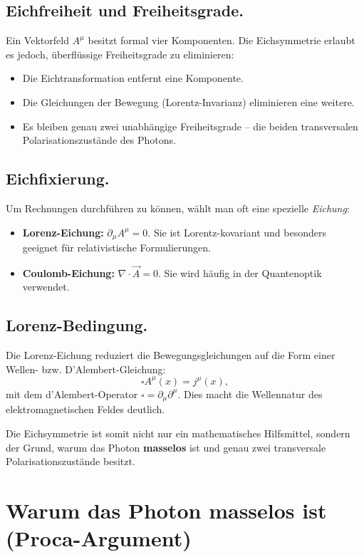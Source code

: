 \subsection*{Eichfreiheit und Freiheitsgrade.}
Ein Vektorfeld \( A^\mu \) besitzt formal vier Komponenten.  
Die Eichsymmetrie erlaubt es jedoch, überflüssige Freiheitsgrade zu eliminieren:
\begin{itemize}
	\item Die Eichtransformation entfernt eine Komponente.
	\item Die Gleichungen der Bewegung (Lorentz-Invarianz) 
	eliminieren eine weitere.
	\item Es bleiben genau zwei unabhängige Freiheitsgrade – 
	die beiden transversalen Polarisationszustände des Photons.
\end{itemize}

\subsection*{Eichfixierung.}
Um Rechnungen durchführen zu können, wählt man oft eine spezielle \emph{Eichung}:
\begin{itemize}
	\item \textbf{Lorenz-Eichung:} 
	\(\partial_\mu A^\mu = 0\).  
	Sie ist Lorentz-kovariant und besonders geeignet für relativistische Formulierungen.
	\item \textbf{Coulomb-Eichung:} 
	\(\nabla \cdot \vec{A} = 0\).  
	Sie wird häufig in der Quantenoptik verwendet.
\end{itemize}

\subsection*{Lorenz-Bedingung.}
Die Lorenz-Eichung reduziert die Bewegungsgleichungen auf die Form einer 
Wellen- bzw. D’Alembert-Gleichung:
\[
\square A^\mu(x) = j^\mu(x),
\]
mit dem d’Alembert-Operator \(\square = \partial_\mu \partial^\mu\).
Dies macht die Wellennatur des elektromagnetischen Feldes deutlich.

\medskip
Die Eichsymmetrie ist somit nicht nur ein mathematisches Hilfsmittel, 
sondern der Grund, warum das Photon \textbf{masselos} ist und 
genau zwei transversale Polarisationszustände besitzt.
\section{Warum das Photon masselos ist  (Proca-Argument)}
\label{anhangA:masselosigkeit_proca}

